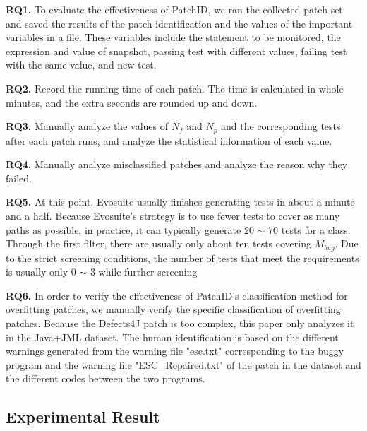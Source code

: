 \documentclass[sn-basic]{sn-jnl}
\theoremstyle{thmstyleone}
\theoremstyle{thmstyletwo}
\theoremstyle{thmstylethree}
\begin{document}
\textbf{RQ1.} To evaluate the effectiveness of PatchID, we ran the collected patch set and saved the results of the patch identification and the values of the important variables in a file. These variables include the statement to be monitored, the expression and value of snapshot, passing test with different values, failing test with the same value, and new test.

\textbf{RQ2.} Record the running time of each patch. The time is calculated in whole minutes, and the extra seconds are rounded up and down.

\textbf{RQ3.} Manually analyze the values of $N_f$ and $N_p$ and the corresponding tests after each patch runs, and analyze the statistical information of each value.

\textbf{RQ4.} Manually analyze misclassified patches and analyze the reason why they failed.

\textbf{RQ5.} At this point, Evosuite usually finishes generating tests in about a minute and a half. Because Evosuite's strategy is to use fewer tests to cover as many paths as possible, in practice, it can typically generate 20 $\sim$ 70 tests for a class. Through the first filter, there are usually only about ten tests covering $M_{bug}$. Due to the strict screening conditions, the number of tests that meet the requirements is usually only 0 $\sim$ 3 while further screening

\textbf{RQ6.} In order to verify the effectiveness of PatchID's classification method for overfitting patches, we manually verify the specific classification of overfitting patches. Because the Defects4J patch is too complex, this paper only analyzes it in the Java+JML dataset. The human identification is based on the different warnings generated from the warning file "esc.txt" corresponding to the buggy program and the warning file "ESC\_Repaired.txt" of the patch in the dataset and the different codes between the two programs.

\subsection{Experimental Result}
\end{document}

